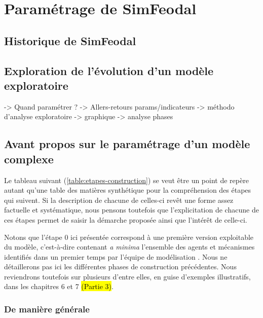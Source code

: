 

\section{Paramétrage de SimFeodal}

\subsection{Historique de SimFeodal}

\subsection{Exploration de l'évolution d'un modèle exploratoire}
 -> Quand paramétrer ?
 	-> Allers-retours params/indicateurs
 -> méthodo d'analyse exploratoire
 	-> graphique
 	-> analyse phases


\subsection{Avant propos sur le paramétrage d'un modèle complexe}


Le tableau suivant (\cref{table:etapes-construction}) se veut être un point de repère autant qu'une table des matières synthétique pour la compréhension des étapes qui suivent.
Si la description de chacune de celles-ci revêt une forme assez factuelle et systématique, nous pensons toutefois que l'explicitation de chacune de ces étapes permet de saisir la démarche proposée ainsi que l'intérêt de celle-ci.

Notons que l'étape 0 ici présentée correspond à une première version \og exploitable\fg{} du modèle, c'est-à-dire contenant \textit{a minima} l'ensemble des agents et mécanismes identifiés dans un premier temps par l'équipe de modélisation \autocite{tannier_ontologie_2014}.
Nous ne détaillerons pas ici les différentes phases de construction précédentes. Nous reviendrons toutefois sur plusieurs d'entre elles, en guise d'exemples illustratifs, dans les chapitres 6 et 7 \hl{(Partie 3)}.

\subsubsection{De manière générale}

